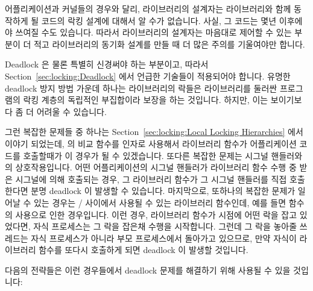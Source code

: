 어플리케이션과 커널들의 경우와 달리, 라이브러리의 설계자는 라이브러리와 함께
동작하게 될 코드의 락킹 설계에 대해서 알 수가 없습니다.
사실, 그 코드는 몇년 이후에야 쓰여질 수도 있습니다.
따라서 라이브러리의 설계자는 마음대로 제어할 수 있는 부분이 더 적고
라이브러리의 동기화 설계를 만들 때 더 많은 주의를 기울여야만 합니다.

Deadlock 은 물론 특별히 신경써야 하는 부분이고, 따라서
Section~\ref{sec:locking:Deadlock} 에서 언급한 기술들이 적용되어야 합니다.
유명한 deadlock 방지 방법 가운데 하나는 라이브러리의 락들은 라이브러리를 둘러싼
프로그램의 락킹 계층의 독립적인 부집합이라 보장을 하는 것입니다.
하지만, 이는 보이기보다 좀 더 어려울 수 있습니다.

그런 복잡한 문제들 중 하나는 Section~\ref{sec:locking:Local Locking
Hierarchies} 에서 이야기 되었는데,  의 비교 함수를 인자로 사용해서
라이브러리 함수가 어플리케이션 코드를 호출할때가 이 경우가 될 수 있겠습니다.
또다른 복잡한 문제는 시그널 핸들러와의 상호작용입니다.
어떤 어플리케이션의 시그널 핸들러가 라이브러리 함수 수행 중 받은 시그널에 의해
호출되는 경우, 그 라이브러리 함수가 그 시그널 핸들러를 직접 호출한다면 분명
deadlock 이 발생할 수 있습니다.
마지막으로, 또하나의 복잡한 문제가 일어날 수 있는 경우는
/ 사이에서 사용될 수 있는 라이브러리 함수인데, 예를 들면
 함수의 사용으로 인한 경우입니다.
이런 경우, 라이브러리 함수가  시점에 어떤 락을 잡고 있었다면, 자식
프로세스는 그 락을 잡은채 수행을 시작합니다.
그런데 그 락을 놓아줄 쓰레드는 자식 프로세스가 아니라 부모 프로세스에서
돌아가고 있으므로, 만약 자식이 라이브러리 함수를 또다시 호출하게 되면 deadlock
이 발생할 것입니다.

다음의 전략들은 이런 경우들에서 deadlock 문제를 해결하기 위해 사용될 수 있을
것입니다:
\iffalse

